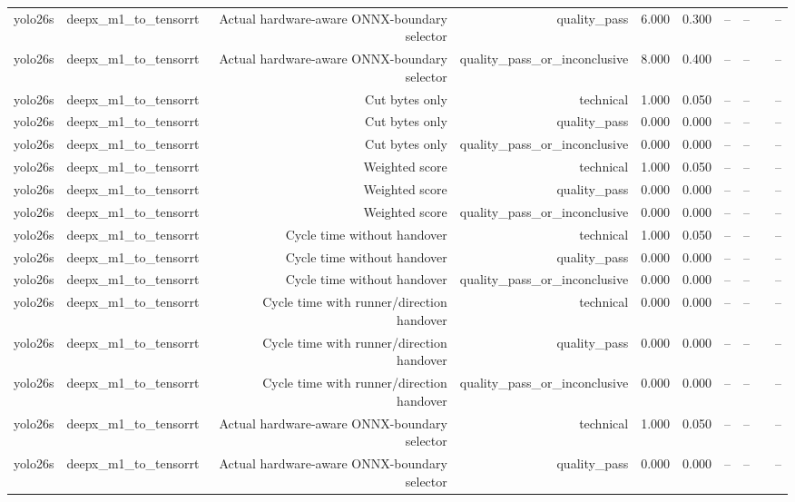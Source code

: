\begin{table}[t]
\begin{tabular}{lrrrrrrrrr}
yolo26s & deepx\_m1\_to\_tensorrt & Actual hardware-aware ONNX-boundary selector & quality\_pass & 6.000 & 0.300 & -- & -- &  & -- \\
yolo26s & deepx\_m1\_to\_tensorrt & Actual hardware-aware ONNX-boundary selector & quality\_pass\_or\_inconclusive & 8.000 & 0.400 & -- & -- &  & -- \\
yolo26s & deepx\_m1\_to\_tensorrt & Cut bytes only & technical & 1.000 & 0.050 & -- & -- &  & -- \\
yolo26s & deepx\_m1\_to\_tensorrt & Cut bytes only & quality\_pass & 0.000 & 0.000 & -- & -- &  & -- \\
yolo26s & deepx\_m1\_to\_tensorrt & Cut bytes only & quality\_pass\_or\_inconclusive & 0.000 & 0.000 & -- & -- &  & -- \\
yolo26s & deepx\_m1\_to\_tensorrt & Weighted score & technical & 1.000 & 0.050 & -- & -- &  & -- \\
yolo26s & deepx\_m1\_to\_tensorrt & Weighted score & quality\_pass & 0.000 & 0.000 & -- & -- &  & -- \\
yolo26s & deepx\_m1\_to\_tensorrt & Weighted score & quality\_pass\_or\_inconclusive & 0.000 & 0.000 & -- & -- &  & -- \\
yolo26s & deepx\_m1\_to\_tensorrt & Cycle time without handover & technical & 1.000 & 0.050 & -- & -- &  & -- \\
yolo26s & deepx\_m1\_to\_tensorrt & Cycle time without handover & quality\_pass & 0.000 & 0.000 & -- & -- &  & -- \\
yolo26s & deepx\_m1\_to\_tensorrt & Cycle time without handover & quality\_pass\_or\_inconclusive & 0.000 & 0.000 & -- & -- &  & -- \\
yolo26s & deepx\_m1\_to\_tensorrt & Cycle time with runner/direction handover & technical & 0.000 & 0.000 & -- & -- &  & -- \\
yolo26s & deepx\_m1\_to\_tensorrt & Cycle time with runner/direction handover & quality\_pass & 0.000 & 0.000 & -- & -- &  & -- \\
yolo26s & deepx\_m1\_to\_tensorrt & Cycle time with runner/direction handover & quality\_pass\_or\_inconclusive & 0.000 & 0.000 & -- & -- &  & -- \\
yolo26s & deepx\_m1\_to\_tensorrt & Actual hardware-aware ONNX-boundary selector & technical & 1.000 & 0.050 & -- & -- &  & -- \\
yolo26s & deepx\_m1\_to\_tensorrt & Actual hardware-aware ONNX-boundary selector & quality\_pass & 0.000 & 0.000 & -- & -- &  & -- \\

\end{tabular}
\end{table}
